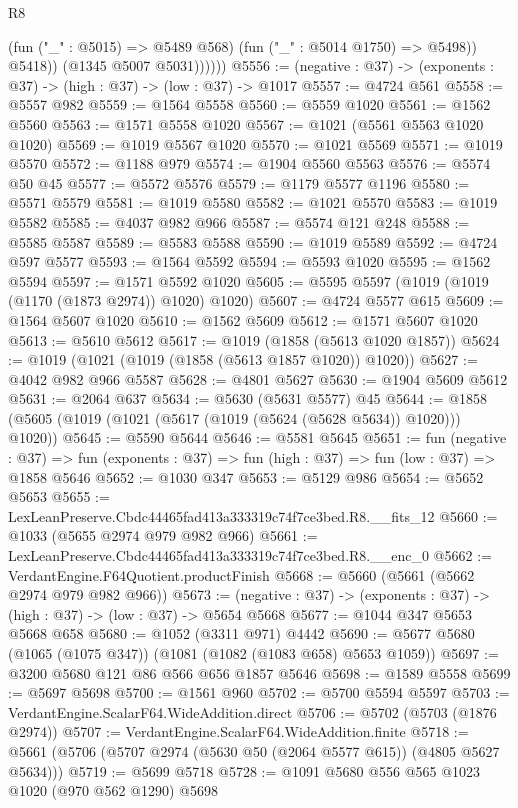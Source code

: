 \begin{lexlean}{R8}
\begin{coremodule}
                    (fun ("_" : @5015) => @5489 @568)
                    (fun ("_" : @5014 @1750) => @5498))
                  @5418))
              (@1345 @5007 @5031))))))
@5556 := (negative : @37) -> (exponents : @37) -> (high : @37) -> (low : @37) -> @1017
@5557 := @4724 @561
@5558 := @5557 @982
@5559 := @1564 @5558
@5560 := @5559 @1020
@5561 := @1562 @5560
@5563 := @1571 @5558 @1020
@5567 := @1021 (@5561 @5563 @1020 @1020)
@5569 := @1019 @5567 @1020
@5570 := @1021 @5569
@5571 := @1019 @5570
@5572 := @1188 @979
@5574 := @1904 @5560 @5563
@5576 := @5574 @50 @45
@5577 := @5572 @5576
@5579 := @1179 @5577 @1196
@5580 := @5571 @5579
@5581 := @1019 @5580
@5582 := @1021 @5570
@5583 := @1019 @5582
@5585 := @4037 @982 @966
@5587 := @5574 @121 @248
@5588 := @5585 @5587
@5589 := @5583 @5588
@5590 := @1019 @5589
@5592 := @4724 @597 @5577
@5593 := @1564 @5592
@5594 := @5593 @1020
@5595 := @1562 @5594
@5597 := @1571 @5592 @1020
@5605 := @5595 @5597 (@1019 (@1019 (@1170 (@1873 @2974)) @1020) @1020)
@5607 := @4724 @5577 @615
@5609 := @1564 @5607 @1020
@5610 := @1562 @5609
@5612 := @1571 @5607 @1020
@5613 := @5610 @5612
@5617 := @1019 (@1858 (@5613 @1020 @1857))
@5624 := @1019 (@1021 (@1019 (@1858 (@5613 @1857 @1020)) @1020))
@5627 := @4042 @982 @966 @5587
@5628 := @4801 @5627
@5630 := @1904 @5609 @5612
@5631 := @2064 @637
@5634 := @5630 (@5631 @5577) @45
@5644 := @1858 (@5605 (@1019 (@1021 (@5617 (@1019 (@5624 (@5628 @5634)) @1020))) @1020))
@5645 := @5590 @5644
@5646 := @5581 @5645
@5651 := fun (negative : @37) =>
  fun (exponents : @37) => fun (high : @37) => fun (low : @37) => @1858 @5646
@5652 := @1030 @347
@5653 := @5129 @986
@5654 := @5652 @5653
@5655 := LexLeanPreserve.Cbdc44465fad413a333319c74f7ce3bed.R8.__fits_12
@5660 := @1033 (@5655 @2974 @979 @982 @966)
@5661 := LexLeanPreserve.Cbdc44465fad413a333319c74f7ce3bed.R8.__enc_0
@5662 := VerdantEngine.F64Quotient.productFinish
@5668 := @5660 (@5661 (@5662 @2974 @979 @982 @966))
@5673 := (negative : @37) -> (exponents : @37) -> (high : @37) -> (low : @37) -> @5654 @5668
@5677 := @1044 @347 @5653 @5668 @658
@5680 := @1052 (@3311 @971) @4442
@5690 := @5677 @5680 (@1065 (@1075 @347)) (@1081 (@1082 (@1083 @658) @5653 @1059))
@5697 := @3200 @5680 @121 @86 @566 @656 @1857 @5646
@5698 := @1589 @5558
@5699 := @5697 @5698
@5700 := @1561 @960
@5702 := @5700 @5594 @5597
@5703 := VerdantEngine.ScalarF64.WideAddition.direct
@5706 := @5702 (@5703 (@1876 @2974))
@5707 := VerdantEngine.ScalarF64.WideAddition.finite
@5718 := @5661 (@5706 (@5707 @2974 (@5630 @50 (@2064 @5577 @615)) (@4805 @5627 @5634)))
@5719 := @5699 @5718
@5728 := @1091 @5680 @556 @565 @1023 @1020 (@970 @562 @1290) @5698

\end{coremodule}
\end{lexlean}
